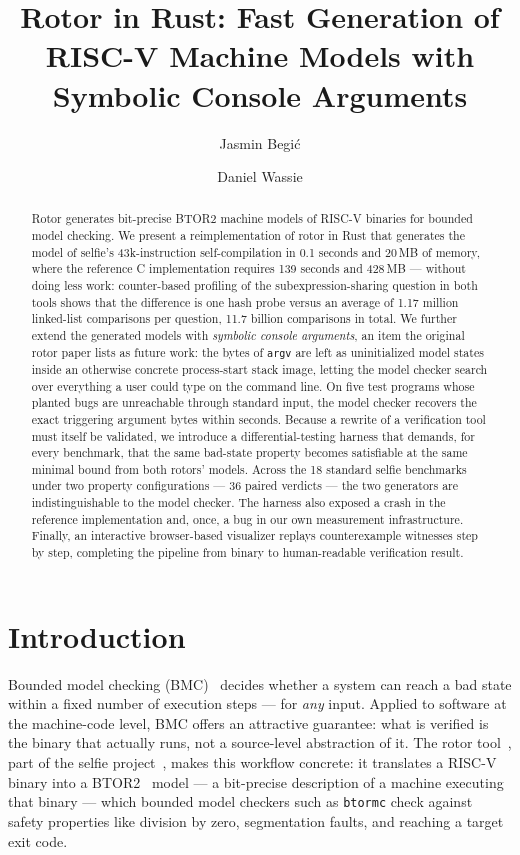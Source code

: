 \documentclass[sigplan,screen,nonacm]{acmart}
\title{Rotor in Rust: Fast Generation of RISC-V Machine Models
       with Symbolic Console Arguments}
\author{Jasmin Begi\'{c}}
\affiliation{%
  \institution{Paris Lodron University of Salzburg}
  \city{Salzburg}\country{Austria}}
\author{Daniel Wassie}
\affiliation{%
  \institution{Paris Lodron University of Salzburg}
  \city{Salzburg}\country{Austria}}
\begin{document}
\begin{abstract}
Rotor generates bit-precise BTOR2 machine models of RISC-V binaries for
bounded model checking. We present a reimplementation of rotor in Rust
that generates the model of selfie's 43k-instruction self-compilation in
0.1 seconds and 20\,MB of memory, where the reference C implementation
requires 139 seconds and 428\,MB --- without doing less work:
counter-based profiling of the subexpression-sharing question in both
tools shows that the difference is one hash probe versus an average of
1.17 million linked-list comparisons per question, 11.7 billion
comparisons in total.
We further extend the generated models with \emph{symbolic console
arguments}, an item the original rotor paper lists as future work: the
bytes of \texttt{argv} are left as uninitialized model states inside an
otherwise concrete process-start stack image, letting the model checker
search over everything a user could type on the command line. On five
test programs whose planted bugs are unreachable through standard input,
the model checker recovers the exact triggering argument bytes within
seconds.
Because a rewrite of a verification tool must itself be validated, we
introduce a differential-testing harness that demands, for every
benchmark, that the same bad-state property becomes satisfiable at the
same minimal bound from both rotors' models. Across the 18 standard
selfie benchmarks under two property configurations --- 36 paired
verdicts --- the two generators are indistinguishable to the model
checker. The harness also exposed a crash in the reference
implementation and, once, a bug in our own measurement infrastructure.
Finally, an interactive browser-based visualizer replays counterexample
witnesses step by step, completing the pipeline from binary to
human-readable verification result.
\end{abstract}


\maketitle

\section{Introduction}

Bounded model checking (BMC)~\cite{biere1999} decides whether a system
can reach a bad state within a fixed number of execution steps --- for
\emph{any} input. Applied to software at the machine-code level, BMC
offers an attractive guarantee: what is verified is the binary that
actually runs, not a source-level abstraction of it. The rotor
tool~\cite{rotorpaper}, part of the selfie project~\cite{selfie}, makes
this workflow concrete: it translates a RISC-V~\cite{riscv} binary into
a BTOR2~\cite{btor2} model --- a bit-precise description of a machine
executing that binary --- which bounded model checkers such as
\texttt{btormc} check against safety properties like division by zero,
segmentation faults, and reaching a target exit code.
\end{document}
